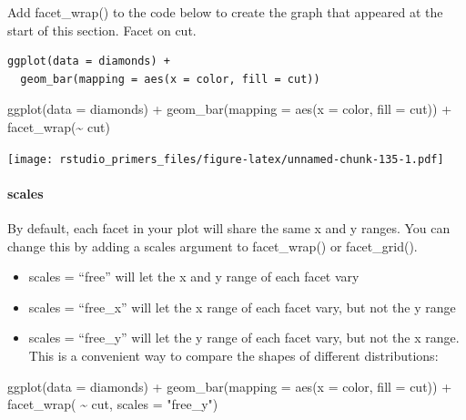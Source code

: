 \documentclass[
]{article}
\newenvironment{Shaded}{\begin{snugshade}}{\end{snugshade}}
\newcommand{\AttributeTok}[1]{\textcolor[rgb]{0.77,0.63,0.00}{#1}}
\newcommand{\FunctionTok}[1]{\textcolor[rgb]{0.00,0.00,0.00}{#1}}
\newcommand{\NormalTok}[1]{#1}
\newcommand{\SpecialCharTok}[1]{\textcolor[rgb]{0.00,0.00,0.00}{#1}}
\newcommand{\StringTok}[1]{\textcolor[rgb]{0.31,0.60,0.02}{#1}}
\providecommand{\tightlist}{%
  \setlength{\itemsep}{0pt}\setlength{\parskip}{0pt}}
\begin{document}
Add facet\_wrap() to the code below to create the graph that appeared at
the start of this section. Facet on cut.

\begin{verbatim}
ggplot(data = diamonds) +
  geom_bar(mapping = aes(x = color, fill = cut))
\end{verbatim}

\begin{Shaded}
\begin{Highlighting}[]
\FunctionTok{ggplot}\NormalTok{(}\AttributeTok{data =}\NormalTok{ diamonds) }\SpecialCharTok{+}
  \FunctionTok{geom\_bar}\NormalTok{(}\AttributeTok{mapping =} \FunctionTok{aes}\NormalTok{(}\AttributeTok{x =}\NormalTok{ color, }\AttributeTok{fill =}\NormalTok{ cut)) }\SpecialCharTok{+} 
  \FunctionTok{facet\_wrap}\NormalTok{(}\SpecialCharTok{\textasciitilde{}}\NormalTok{ cut)}
\end{Highlighting}
\end{Shaded}

\texttt{[image: rstudio\_primers\_files/figure-latex/unnamed-chunk-135-1.pdf]}

\hypertarget{scales}{%
\paragraph{scales}\label{scales}}

By default, each facet in your plot will share the same x and y ranges.
You can change this by adding a scales argument to facet\_wrap() or
facet\_grid().

\begin{itemize}
\tightlist
\item
  scales = ``free'' will let the x and y range of each facet vary
\item
  scales = ``free\_x'' will let the x range of each facet vary, but not
  the y range
\item
  scales = ``free\_y'' will let the y range of each facet vary, but not
  the x range. This is a convenient way to compare the shapes of
  different distributions:
\end{itemize}

\begin{Shaded}
\begin{Highlighting}[]
\FunctionTok{ggplot}\NormalTok{(}\AttributeTok{data =}\NormalTok{ diamonds) }\SpecialCharTok{+}
  \FunctionTok{geom\_bar}\NormalTok{(}\AttributeTok{mapping =} \FunctionTok{aes}\NormalTok{(}\AttributeTok{x =}\NormalTok{ color, }\AttributeTok{fill =}\NormalTok{ cut)) }\SpecialCharTok{+}
  \FunctionTok{facet\_wrap}\NormalTok{( }\SpecialCharTok{\textasciitilde{}}\NormalTok{ cut, }\AttributeTok{scales =} \StringTok{"free\_y"}\NormalTok{)}
\end{Highlighting}
\end{Shaded}
\end{document}
